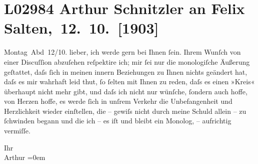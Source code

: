 

\section[ Arthur Schnitzler an Felix Salten, 12. 10. {[}1903{]}]{L02984 Arthur Schnitzler an Felix Salten, 12. 10. {[}1903{]}}
\nopagebreak{}
\rehead{ }\normalsize\beginnumbering{}
\toendnotes[C]{\smallbreak\pagebreak[2]}
\toendnotes[C]{\smallbreak}
\pstart
           \raggedleft{}{\pb}Montag Abd 12/10.\pend
           \vspace{0.5em}
\pstart
           lieber, ich werde \label{K_L02984-1v}\label{K_L02984-1} gern bei Ihnen ſein. Ihrem Wunſch von einer Discuſſion abzuſehen reſpektire
               ich; mir ſei nur die monologiſche Äußerung geſtattet, daſs ſich in meinen innern
               Beziehungen zu Ihnen nichts geändert hat, daſs es mir wahrhaft leid thut, ſo ſelten
               mit Ihnen zu reden, daſs es {\pb}einen »Kreis«
               überhaupt nicht mehr gibt, und daſs ich nicht nur wünſche, ſondern auch hoffe,  von Herzen hoffe, es werde ſich in unſrem Verkehr
               die Unbefangenheit und Herzlichkeit wieder einſtellen, die – gewiſs nicht durch meine
               Schuld allein – zu ſchwinden begann und die ich – es iſt {\pb}und bleibt ein Monolog, – aufrichtig
               vermiſſe.\pend
           
\pstart
           Ihr {\\[\baselineskip]}\spacefill\mbox{Arthur}\pend
           \leftskip=0em{}\endnumbering{}  
      